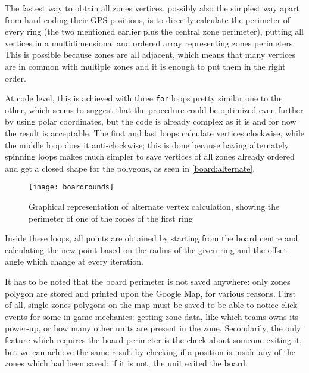 			The fastest way to obtain all zones vertices, possibly also the simplest way apart from hard-coding their GPS positions, is to directly calculate the perimeter of every ring (the two mentioned earlier plus the central zone perimeter), putting all vertices in a multidimensional and ordered array representing zones perimeters.
			This is possible because zones are all adjacent, which means that many vertices are in common with multiple zones and it is enough to put them in the right order.
			
			At code level, this is achieved with three \lstinline|for| loops pretty similar one to the other, which seems to suggest that the procedure could be optimized even further by using polar coordinates, but the code is already complex as it is and for now the result is acceptable.
			The first and last loops calculate vertices clockwise, while the middle loop does it anti-clockwise; this is done because having alternately spinning loops makes much simpler to save vertices of all zones already ordered and get a closed shape for the polygons, as seen in \autoref{board:alternate}.
			
			\begin{figure}[htp]
				\centering
				\texttt{[image: boardrounds]}
				\caption{Graphical representation of alternate vertex calculation, showing the perimeter of one of the zones of the first ring}\label{board:alternate}
			\end{figure}
			
			Inside these loops, all points are obtained by starting from the board centre and calculating the new point based on the radius of the given ring and the offset angle which change at every iteration.
			
			It has to be noted that the board perimeter is not saved anywhere: only zones polygon are stored and printed upon the Google Map, for various reasons.
			First of all, single zones polygons on the map must be saved to be able to notice click events for some in-game mechanics: getting zone data, like which teams owns its power-up, or how many other units are present in the zone.
			Secondarily, the only feature which requires the board perimeter is the check about someone exiting it, but we can achieve the same result by checking if a position is inside any of the zones which had been saved: if it is not, the unit exited the board.
			
			\newpage
			
			
			
